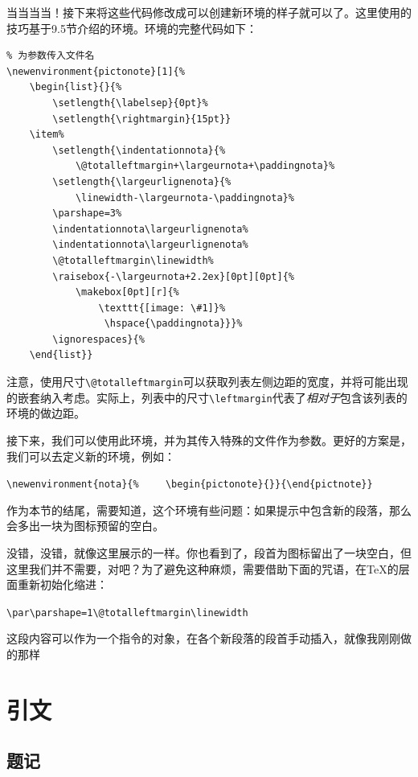 当当当当！接下来将这些代码修改成可以创建新环境的样子就可以了。这里使用的技巧基于9.5节介绍的环境。环境的完整代码如下：

\begin{dmd}
\begin{verbatim}
% 为参数传入文件名
\newenvironment{pictonote}[1]{% 
    \begin{list}{}{%
        \setlength{\labelsep}{0pt}%
        \setlength{\rightmargin}{15pt}} 
    \item%
        \setlength{\indentationnota}{% 
            \@totalleftmargin+\largeurnota+\paddingnota}%
        \setlength{\largeurlignenota}{% 
            \linewidth-\largeurnota-\paddingnota}%
        \parshape=3% 
        \indentationnota\largeurlignenota% 
        \indentationnota\largeurlignenota% 
        \@totalleftmargin\linewidth% 
        \raisebox{-\largeurnota+2.2ex}[0pt][0pt]{%
            \makebox[0pt][r]{% 
                \texttt{[image: \#1]}%
                 \hspace{\paddingnota}}}%
        \ignorespaces}{% 
    \end{list}}
\end{verbatim}
\end{dmd}

\begin{exclamation}
注意，使用尺寸\verb|\@totalleftmargin|可以获取列表左侧边距的宽度，并将可能出现的嵌套纳入考虑。实际上，列表中的尺寸\verb|\leftmargin|代表了\emph{相对于}包含该列表的环境的做边距。
\end{exclamation}

接下来，我们可以使用此环境，并为其传入特殊的文件作为参数。更好的方案是，我们可以去定义新的环境，例如：

\begin{dmd}
\verb+\newenvironment{nota}{%+
\verb+    \begin{pictonote}{+\verb+}}{\end{pictnote}}+
\end{dmd}

\begin{qquestion}
作为本节的结尾，需要知道，这个环境有些问题：如果提示中包含新的段落，那么会多出一块为图标预留的空白。%

没错，没错，就像这里展示的一样。你也看到了，段首为图标留出了一块空白，但这里我们并不需要，对吧？为了避免这种麻烦，需要借助下面的咒语，在\TeX 的层面重新初始化缩进：

\begin{dmd}
\verb|\par\parshape=1\@totalleftmargin\linewidth|
\end{dmd}

这段内容可以作为一个指令的对象，在各个新段落的段首手动插入，就像我刚刚做的那样\dm{:-)}
\end{qquestion}

\section{引文}

\subsection{题记}

